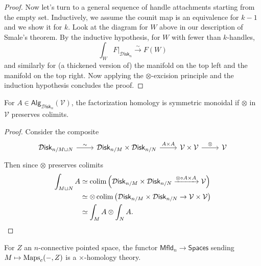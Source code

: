 \documentclass{amsart}
\begin{document}
\begin{proof}
    Now let's turn to a general sequence of handle attachments starting from the empty set.
    Inductively, we assume the counit map is an equivalence for $k-1$ and we show it for $k$.
    Look at the diagram for $W$ above in our description of Smale's theorem.
    By the inductive hypothesis, for $W$ with fewer than $k$-handles,
    \begin{equation*}
        \int_W F|_{\mathcal{D}\mathsf{isk}_n}\xrightarrow{\sim} F(W)
    \end{equation*}
    and similarly for (a thickened version of) the manifold on the top left and the manifold on the top right.
    Now applying the $\otimes$-excision principle and the induction hypothesis concludes the proof.
\end{proof}

\begin{lemma}
    For $A\in\mathsf{Alg}_{\mathcal{D}\mathsf{isk}_n}(\mathcal{V})$, the factorization
    homology is symmetric monoidal if $\otimes$ in $\mathcal{V}$ preserves colimits.
\end{lemma}
\begin{proof}
    Consider the composite
    \begin{equation*}
        \begin{tikzcd}
            \mathcal{D}\mathsf{isk}_{n/M\sqcup N}\rar{\sim} & \mathcal{D}\mathsf{isk}_{n/M}\times \mathcal{D}\mathsf{isk}_{n/N}\rar{A\times A} & \mathcal{V}\times\mathcal{V}\rar{\otimes} & \mathcal{V}
        \end{tikzcd}
    \end{equation*}
    Then since $\otimes$ preserves colimits
    \begin{align*}
        \int_{M\sqcup N}A &\simeq \operatorname*{colim}\left( \mathcal{D}\mathsf{isk}_{n/M}\times\mathcal{D}\mathsf{isk}_{n/N} \xrightarrow{\otimes\circ A\times A} \mathcal{V}\right) \\
        &\simeq \otimes \operatorname*{colim}\left( \mathcal{D}\mathsf{isk}_{n/M}\times \mathcal{D}\mathsf{isk}_{n/N}\to \mathcal{V}\times \mathcal{V} \right) \\
        &\simeq \int_M A \otimes \int_N A.
    \end{align*}
\end{proof}

\begin{lemma}
    For $Z$ an $n$-connective pointed space, the functor $\mathsf{Mfld}_n\to\mathsf{Spaces}$
    sending $M\mapsto \operatorname{Maps}_c(-,Z)$ is a $\times$-homology theory.
\end{lemma}
\end{document}
